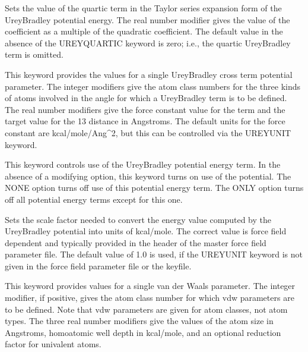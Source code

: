 \documentclass[letterpaper,11pt,english]{sphinxmanual}
\begin{document}
  Sets the value of the quartic term in the Taylor series expansion form of the Urey\sphinxhyphen{}Bradley potential energy. The real number modifier gives the value of the coefficient as a multiple of the quadratic coefficient. The default value in the absence of the UREY\sphinxhyphen{}QUARTIC keyword is zero; i.e., the quartic Urey\sphinxhyphen{}Bradley term is omitted.

  This keyword provides the values for a single Urey\sphinxhyphen{}Bradley cross term potential parameter. The integer modifiers give the atom class numbers for the three kinds of atoms involved in the angle for which a Urey\sphinxhyphen{}Bradley term is to be defined. The real number modifiers give the force constant value for the term and the target value for the 1\sphinxhyphen{}3 distance in Angstroms. The default units for the force constant are kcal/mole/Ang\textasciicircum{}2, but this can be controlled via the UREYUNIT keyword.

  This keyword controls use of the Urey\sphinxhyphen{}Bradley potential energy term. In the absence of a modifying option, this keyword turns on use of the potential. The NONE option turns off use of this potential energy term. The ONLY option turns off all potential energy terms except for this one.

  Sets the scale factor needed to convert the energy value computed by the Urey\sphinxhyphen{}Bradley potential into units of kcal/mole. The correct value is force field dependent and typically provided in the header of the master force field parameter file. The default value of 1.0 is used, if the UREYUNIT keyword is not given in the force field parameter file or the keyfile.




  This keyword provides values for a single van der Waals parameter. The integer modifier, if positive, gives the atom class number for which vdw parameters are to be defined. Note that vdw parameters are given for atom classes, not atom types. The three real number modifiers give the values of the atom size in Angstroms, homoatomic well depth in kcal/mole, and an optional reduction factor for univalent atoms.
\end{document}
